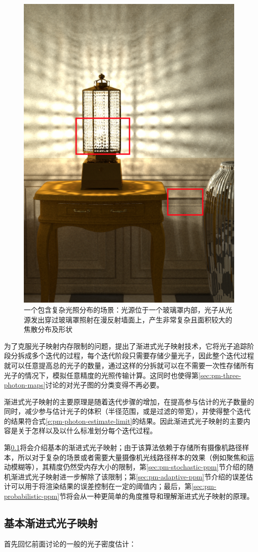 \begin{figure}
\sidecaption
	\includegraphics[width=.35\textwidth]{figures/pm/pm-21}
	\caption{一个包含复杂光照分布的场景：光源位于一个玻璃罩内部，光子从光源发出穿过玻璃罩照射在漫反射墙面上，产生非常复杂且面积较大的焦散分布及形状}
	\label{f:pm-complex-caustics}
\end{figure}

为了克服光子映射内存限制的问题，\cite{a:ProgressivePhotonMapping}提出了渐进式光子映射技术，它将光子追踪阶段分拆成多个迭代的过程，每个迭代阶段只需要存储少量光子，因此整个迭代过程就可以任意提高总的光子的数量，通过这样的分拆就可以在不需要一次性存储所有光子的情况下，模拟任意精度的光照传输计算。这同时也使得第\ref{sec:pm-three-photon-maps}讨论的对光子图的分类变得不再必要。

渐进式光子映射的主要原理是随着迭代步骤的增加，在提高参与估计的光子数量的同时，减少参与估计光子的体积（半径范围，或是过滤的带宽），并使得整个迭代的结果符合式\ref{e:pm-photon-estimate-limit}的结果。因此渐进式光子映射的主要内容是关于怎样以及以什么标准划分每个迭代过程。

第\ref{sec:pm-basic-ppm}将会介绍基本的渐进式光子映射；由于该算法依赖于存储所有摄像机路径样本，所以对于复杂的场景或者需要大量摄像机光线路径样本的效果（例如聚焦和运动模糊等），其精度仍然受内存大小的限制，第\ref{sec:pm-stochastic-ppm}节介绍的随机渐进式光子映射进一步解除了该限制；第\ref{sec:pm-adaptive-ppm}节介绍的误差估计可以用于将渲染结果的误差控制在一定的阈值内；最后，第\ref{sec:pm-probabilistic-ppm}节将会从一种更简单的角度推导和理解渐进式光子映射的原理。





\subsection{基本渐进式光子映射}\label{sec:pm-basic-ppm}
首先回忆前面讨论的一般的光子密度估计：

